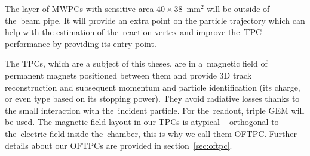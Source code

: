 		The layer of \ac{MWPC}s with sensitive area $40\times38$~mm$^2$ will be outside of the~beam pipe. It will provide an extra point on the particle trajectory which can help with the estimation of the~reaction vertex and improve the~\ac{TPC} performance by providing its entry point.
		
		The \ac{TPC}s, which are a subject of this theses, are in a~magnetic field of permanent magnets positioned between them and provide 3D track reconstruction and subsequent momentum and particle identification (its charge, or even type based on its stopping power). They avoid radiative losses thanks to the small interaction with the~incident particle. For the~readout, triple \ac{GEM} will be used. The magnetic field layout in our \ac{TPC}s is atypical -- orthogonal to the~electric field inside the~chamber, this is why we call them \acf{OFTPC}. Further details about our \ac{OFTPC}s are provided in section~\ref{sec:oftpc}.